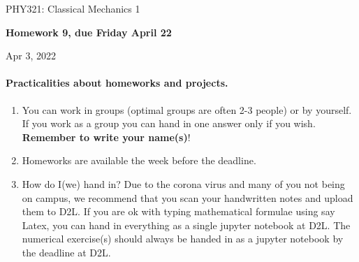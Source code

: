 \documentclass[%
oneside,                 %
final,                   %
10pt]{article}
\begin{document}

\newcommand{\exercisesection}[1]{\subsection*{#1}}






\thispagestyle{empty}

\begin{center}
{\LARGE\bf
\begin{spacing}{1.25}
PHY321: Classical Mechanics 1
\end{spacing}
}
\end{center}


\begin{center}
{\bf Homework 9, due Friday  April 22${}^{}$} \\ [0mm]
\end{center}

\begin{center}
\end{center}
    

\begin{center}
Apr 3, 2022
\end{center}

\vspace{1cm}


\paragraph{Practicalities about  homeworks and projects.}
\begin{enumerate}
\item You can work in groups (optimal groups are often 2-3 people) or by yourself. If you work as a group you can hand in one answer only if you wish. \textbf{Remember to write your name(s)}!

\item Homeworks are available  the week before the deadline. 

\item How do I(we)  hand in?  Due to the corona virus and many of you not being on campus, we recommend that you scan your handwritten notes and upload them to D2L. If you are ok with typing mathematical formulae using say Latex, you can hand in everything as a single jupyter notebook at D2L. The numerical exercise(s) should always be handed in as a jupyter notebook by the deadline at D2L. 
\end{enumerate}
\end{document}
